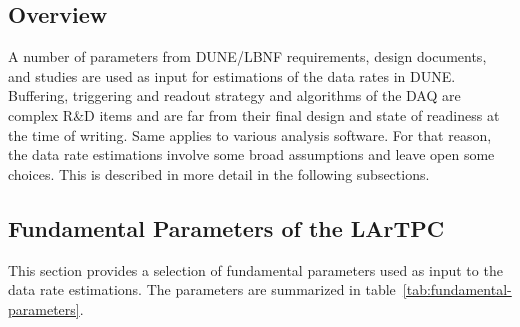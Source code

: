 \subsection{Overview}

A number of parameters from DUNE/LBNF requirements, design documents,  and studies are used  as input
for estimations of the data rates in DUNE.
Buffering, triggering and readout strategy and algorithms of the DAQ
are complex R\&D items and are far from their final design and state of
readiness at the time of writing. Same applies to various analysis software.
For that reason, the data rate estimations involve some broad assumptions
and leave open some choices. This is described in more detail in the following subsections.

\subsection{Fundamental Parameters of the LArTPC}

This section provides a selection of fundamental parameters used as
input to the data rate estimations. The parameters are summarized in table~\ref{tab:fundamental-parameters}.

